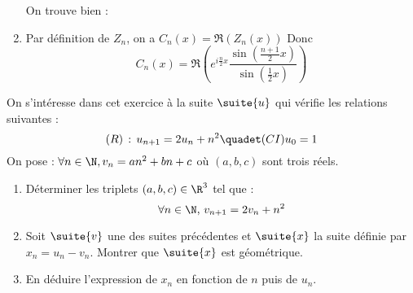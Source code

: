\documentclass[a4paper, 11pt,reqno]{article}
\begin{document}
\begin{correction}
\begin{enumerate}
On trouve bien : 

\item Par définition de $Z_n$, on a $C_n(x) =\Re(Z_n(x))$
Donc 
$$C_n(x)= \Re\left(
e^{i\frac{n}{2}x}  \frac{\sin \left( \frac{n+1}{2}x\right)}{\sin \left( \frac{1}{2}x\right)}\right)$$


\end{enumerate}
\end{correction}



\begin{exercice}
On s'intéresse dans cet exercice à la  suite $\suite{u}$ qui vérifie les relations suivantes : 
$$(R)\, :\, 
u_{n+1} =2u_n+n^2\quadet (CI) u_0=1$$
 On pose : $ \forall n\in \N, v_n =an^2+bn+c$ où $(a,b,c)$ sont trois réels.  
\begin{enumerate}
\item Déterminer les triplets $(a,b,c)\in \R^3$ tel que :
$$\forall n\in \N,\,v_{n+1} =2v_n+n^2$$
\item Soit $\suite{v}$ une des suites précédentes et $\suite{x}$ la suite définie par  $x_n=u_n-v_n$. Montrer que $\suite{x}$ est géométrique. 
\item En déduire l'expression de $x_n$ en fonction de $n$ puis de $u_n$. 
\end{enumerate}
\end{exercice}
\end{document}
